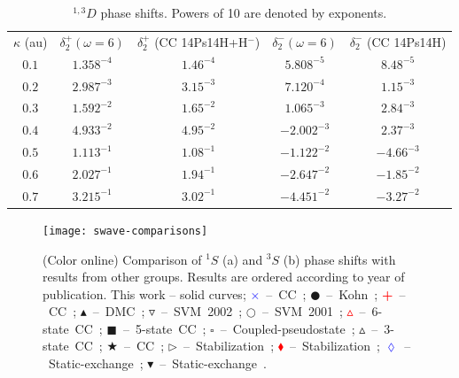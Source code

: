 \documentclass[preprint,showpacs,showkeys,preprintnumbers,amsmath,amssymb,longbibliography,pra,aps]{revtex4-1}
\begin{document}
\begin{table}
\begin{center}
\begin{ruledtabular}
\begin{tabular}{c c c c c}
$\kappa$ (au) & $\delta_2^+ (\omega = 6)$ & $\delta_2^+$ (CC 14Ps14H+H$^-$) \cite{Walters2004} & $\delta_2^- (\omega = 6)$ & $\delta_2^-$ (CC 14Ps14H) \cite{Blackwood2002} \\
\colrule
$0.1$ & $1.358^{-4}$ & $1.46^{-4}$ & $5.808^{-5}$ & $8.48^{-5}$ \\
$0.2$ & $2.987^{-3}$ & $3.15^{-3}$ & $7.120^{-4}$ & $1.15^{-3}$ \\
$0.3$ & $1.592^{-2}$ & $1.65^{-2}$ & $1.065^{-3}$ & $2.84^{-3}$ \\
$0.4$ & $4.933^{-2}$ & $4.95^{-2}$ & $-2.002^{-3}$ & $2.37^{-3}$ \\
$0.5$ & $1.113^{-1}$ & $1.08^{-1}$ & $-1.122^{-2}$ & $-4.66^{-3}$ \\
$0.6$ & $2.027^{-1}$ & $1.94^{-1}$ & $-2.647^{-2}$ & $-1.85^{-2}$ \\
$0.7$ & $3.215^{-1}$ & $3.02^{-1}$ & $-4.451^{-2}$ & $-3.27^{-2}$ \\
\end{tabular}
\end{ruledtabular}
\caption{$^{1,3}D$ phase shifts. Powers of 10 are denoted by exponents.}
\label{tab:DWavePhase}
\end{center}
\end{table}



\begin{figure}[H]
	\centering
	\texttt{[image: swave-comparisons]}
	\caption{(Color online) Comparison of $^1S$ (a) and $^3S$ (b) phase shifts
with results from other groups. Results are ordered according to year of
publication. This work -- solid curves;
\mbox{\textcolor{blue}{$\times$} -- CC \cite{Walters2004};}
\mbox{$\CIRCLE$ -- Kohn \cite{VanReeth2003};}
\mbox{\textcolor{red}{\textbf{+}} -- CC \cite{Blackwood2002};}
\mbox{$\blacktriangle$ -- DMC \cite{Chiesa2002};} 
\mbox{$\triangledown$ -- SVM 2002 \cite{Ivanov2002};} 
\mbox{$\Circle$ -- SVM 2001 \cite{Ivanov2001};} 
\mbox{\textcolor{red}{$\vartriangle$} -- 6-state CC \cite{Sinha2000};} 
\mbox{$\blacksquare$ -- 5-state CC \cite{Adhikari1999};} 
\mbox{$\square$ -- Coupled-pseudostate \cite{Campbell1998};} 
\mbox{$\vartriangle$ -- 3-state CC \cite{Sinha1997};} 
\mbox{\textcolor[RGB]{0,127,0}{$\bigstar$} -- CC \cite{Ray1997};} 
\mbox{$\triangleright$ -- Stabilization \cite{Drachman1976};} 
\mbox{\textcolor{red}{$\blacklozenge$} -- Stabilization \cite{Drachman1975};}
\mbox{\textcolor{blue}{$\lozenge$} -- Static-exchange \cite{Hara1975};}
\mbox{$\blacktriangledown$ -- Static-exchange \cite{Fraser1961}.}}
	\label{fig:swave-comparisons}
\end{figure}
\end{document}
